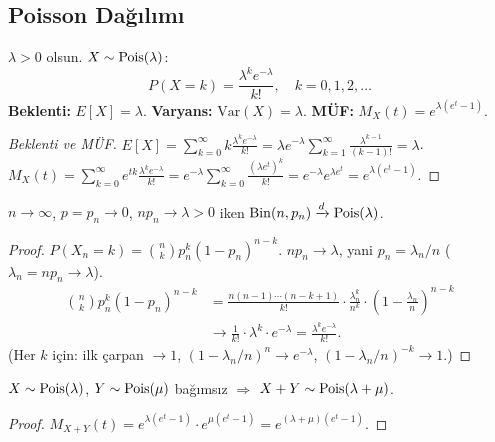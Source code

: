 \subsection{Poisson Dağılımı}
\label{subsec:poisson}

\begin{tanim}
\label{def:poisson}
$\lambda > 0$ olsun. $X \sim \operatorname{Pois}(\lambda)$:
\[
  P(X = k) = \frac{\lambda^k e^{-\lambda}}{k!}, \quad k = 0, 1, 2, \ldots
\]
\textbf{Beklenti:} $E[X] = \lambda$. \quad
\textbf{Varyans:} $\mathrm{Var}(X) = \lambda$. \quad
\textbf{MÜF:} $M_X(t) = e^{\lambda(e^t - 1)}$.
\end{tanim}

\begin{proof}[Beklenti ve MÜF]
$E[X] = \sum_{k=0}^\infty k \frac{\lambda^k e^{-\lambda}}{k!}
= \lambda e^{-\lambda} \sum_{k=1}^\infty \frac{\lambda^{k-1}}{(k-1)!} = \lambda$.
$M_X(t) = \sum_{k=0}^\infty e^{tk} \frac{\lambda^k e^{-\lambda}}{k!}
= e^{-\lambda} \sum_{k=0}^\infty \frac{(\lambda e^t)^k}{k!} = e^{-\lambda} e^{\lambda e^t} = e^{\lambda(e^t-1)}$.
\end{proof}

\begin{teorem}
\label{thm:binom_poisson}
$n \to \infty$, $p = p_n \to 0$, $np_n \to \lambda > 0$ iken
$\operatorname{Bin}(n, p_n) \xrightarrow{d} \operatorname{Pois}(\lambda)$.
\end{teorem}

\begin{proof}
$P(X_n = k) = \binom{n}{k} p_n^k (1-p_n)^{n-k}$.
$np_n \to \lambda$, yani $p_n = \lambda_n/n$ ($\lambda_n = np_n \to \lambda$).
\begin{align*}
  \binom{n}{k} p_n^k (1-p_n)^{n-k}
  &= \frac{n(n-1)\cdots(n-k+1)}{k!} \cdot \frac{\lambda_n^k}{n^k} \cdot \left(1 - \frac{\lambda_n}{n}\right)^{n-k} \\
  &\to \frac{1}{k!} \cdot \lambda^k \cdot e^{-\lambda} = \frac{\lambda^k e^{-\lambda}}{k!}.
\end{align*}
(Her $k$ için: ilk çarpan $\to 1$, $(1-\lambda_n/n)^n \to e^{-\lambda}$, $(1-\lambda_n/n)^{-k} \to 1$.)
\end{proof}

\begin{onerme}
$X \sim \operatorname{Pois}(\lambda)$, $Y \sim \operatorname{Pois}(\mu)$ bağımsız $\Rightarrow$ $X+Y \sim \operatorname{Pois}(\lambda+\mu)$.
\end{onerme}

\begin{proof}
$M_{X+Y}(t) = e^{\lambda(e^t-1)} \cdot e^{\mu(e^t-1)} = e^{(\lambda+\mu)(e^t-1)}$.
\end{proof}

